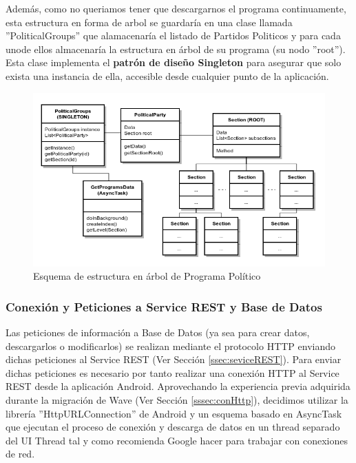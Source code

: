 	  Además, como no queriamos tener que descargarnos el programa continuamente, esta estructura en forma de arbol se guardaría en una clase llamada ''PoliticalGroups'' que alamacenaría el listado de Partidos Politicos y para cada unode ellos almacenaría la estructura en árbol de su programa (su nodo ''root''). Esta clase implementa el \textbf{patrón de diseño Singleton} para asegurar que solo exista una instancia de ella, accesible desde cualquier punto de la aplicación. 
	  
	\begin{figure}[H]
	  \centering
	    \includegraphics[keepaspectratio, scale=0.6]{Media/Diagrams/classSectionTree.png}
	  \caption{Esquema de estructura en árbol de Programa Político}
	  \label{fig:classSecTree}
	\end{figure}	
	
	\subsubsection{Conexión y Peticiones a Service REST y Base de Datos}

		Las peticiones de información a Base de Datos (ya sea para crear datos, descargarlos o modificarlos) se realizan mediante el protocolo HTTP enviando dichas peticiones al Service REST (Ver Sección \ref{ssec:seviceREST}). Para enviar dichas peticiones es necesario por tanto realizar una conexión HTTP al Service REST desde la aplicación Android. Aprovechando la experiencia previa adquirida durante la migración de Wave (Ver Sección \ref{sssec:conHttp}), decidimos utilizar la librería ''HttpURLConnection'' de Android y un esquema basado en AsyncTask que ejecutan el proceso de conexión y descarga de datos en un thread separado del UI Thread tal y como recomienda Google hacer para trabajar con conexiones de red\cite{ref:android_networking}.
		
